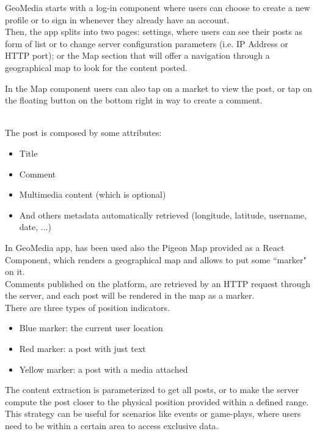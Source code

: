 \documentclass[conference]{IEEEtran}
\begin{document}
GeoMedia starts with a log-in component where users can choose to create a new profile or to sign in whenever they already have an account.
\\
Then, the app splits into two pages: settings, where users can see their posts as form of list or to change server configuration parameters (i.e. IP Address or HTTP port); or the Map section that will offer a navigation through a geographical map to look for the content posted.


In the Map component users can also tap on a market to view the post, or tap on the floating button on the bottom right in way to create a comment.


\\The post is composed by some attributes:
\begin{itemize}
    \item Title
    \item Comment
    \item Multimedia content (which is optional)
    \item And others metadata automatically retrieved (longitude, latitude, username, date, ...)
\end{itemize}

In GeoMedia app, has been used also the Pigeon Map\cite{b8} provided as a React Component, which renders a geographical map and allows to put some ``marker" on it.
\\
Comments published on the platform, are retrieved by an HTTP request through the server, and each post will be rendered in the map as a marker.
\\There are three types of position indicators.
\begin{itemize}
\item Blue marker: the current user location
\item Red marker: a post with just text
\item Yellow marker: a post with a media attached 
\end{itemize}

The content extraction is parameterized to get all posts, or to make the server compute the post closer to the physical position provided within a defined range.
This strategy can be useful for scenarios like events or game-plays, where users need to be  within a certain area to access exclusive data.
\end{document}

